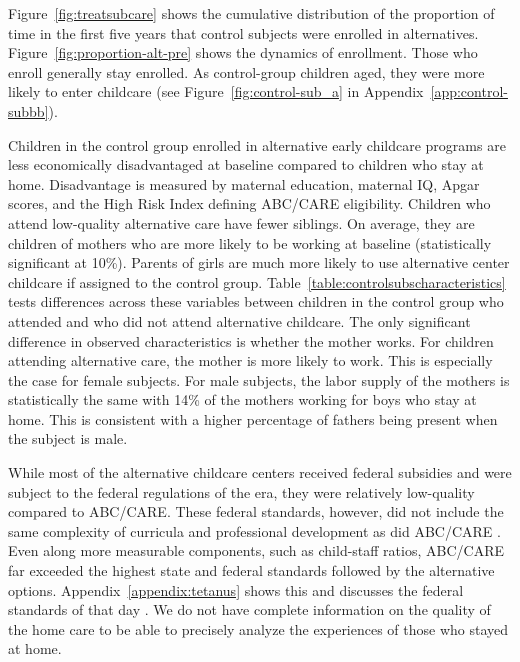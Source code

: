 Figure~\ref{fig:treatsubcare} shows the cumulative distribution of the proportion of time in the first five years that control subjects were enrolled in alternatives. Figure~\ref{fig:proportion-alt-pre} shows the dynamics of enrollment. Those who enroll generally stay enrolled. As control-group children aged, they were more likely to enter childcare (see Figure~\ref{fig:control-sub_a} in Appendix~\ref{app:control-subbb}).

Children in the control group enrolled in alternative early childcare programs are less economically disadvantaged at baseline compared to children who stay at home. Disadvantage is measured by maternal education, maternal IQ, Apgar scores, and the High Risk Index defining ABC/CARE eligibility. Children who attend low-quality alternative care have fewer siblings. On average, they are children of mothers who are more likely to be working at baseline (statistically significant at 10\%). Parents of girls are much more likely to use alternative center childcare if assigned to the control group. Table~\ref{table:controlsubscharacteristics} tests differences across these variables between children in the control group who attended and who did not attend alternative childcare. The only significant difference in observed characteristics is whether the mother works. For children attending alternative care, the mother is more likely to work. This is especially the case for female subjects. For male subjects, the labor supply of the mothers is statistically the same with 14\% of the mothers working for boys who stay at home. This is consistent with a higher percentage of fathers being present when the subject is male.

While most of the alternative childcare centers received federal subsidies and were subject to the federal regulations of the era, they were relatively low-quality compared to ABC/CARE. These federal standards, however, did not include the same complexity of curricula and professional development as did ABC/CARE \citep{Burchinal_etal_1989_CD_Daycare-Pre-K-Dev}. Even along more measurable components, such as child-staff ratios, ABC/CARE far exceeded the highest state and federal standards followed by the alternative options. Appendix~\ref{appendix:tetanus} shows this and discusses the federal standards of that day \citep{Department-of-Health_1968_DayCareRequirements,NCGA_1971_House-Bill-100,Ramey-et-al_1977_Intro-to-ABC,Ramey_Campbell_1979_SR,Ramey_McGinness_etal_1982_Abecedarianapproach,Burchinal_Campbell_etal_1997_CD}. We do not have complete information on the quality of the home care to be able to precisely analyze the experiences of those who stayed at home. 

